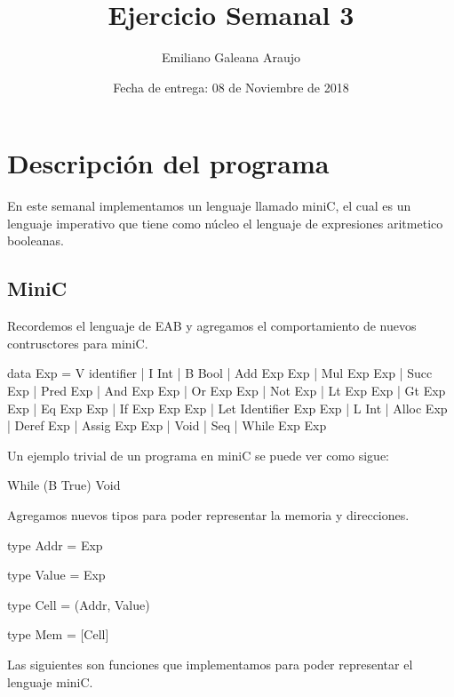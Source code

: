 \documentclass[spanish,12pt,letterpaper]{article}
\title{Ejercicio Semanal 3}
\author{Emiliano Galeana Araujo}
\affil{Facultad de Ciencias, UNAM}
\date{Fecha de entrega: 08 de Noviembre de 2018}
\begin{document}
\maketitle

\section{Descripción del programa}
En este semanal implementamos un lenguaje llamado miniC, el cual es un lenguaje
imperativo que tiene como núcleo el lenguaje de expresiones aritmetico booleanas.
\subsection{MiniC}
Recordemos el lenguaje de EAB y agregamos el comportamiento de nuevos
contrusctores para miniC.
\begin{code}
  data Exp = V identifier | I Int | B Bool
    | Add Exp Exp | Mul Exp Exp | Succ Exp | Pred Exp 
    | And Exp Exp | Or Exp Exp  | Not Exp
    | Lt Exp Exp  | Gt Exp Exp  | Eq Exp Exp
    | If Exp Exp Exp
    | Let Identifier Exp Exp
    | L Int
    | Alloc Exp
    | Deref Exp
    | Assig Exp Exp
    | Void
    | Seq
    | While Exp Exp
\end{code}
Un ejemplo trivial de un programa en miniC se puede ver como sigue:
\begin{code}
  While (B True) Void
\end{code}

Agregamos nuevos tipos para poder representar la memoria y direcciones.

\begin{code}
   type Addr = Exp

   type Value = Exp

   type Cell = (Addr, Value)

   type Mem = [Cell]
\end{code}

Las siguientes son funciones que implementamos para poder representar el
lenguaje miniC.
\end{document}
